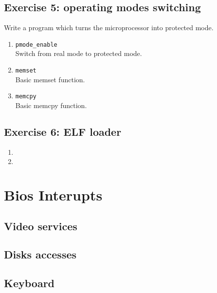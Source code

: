 \subsection*{Exercise 5: operating modes switching}

Write a program which turns the microprocessor into protected mode.

  \begin{enumerate}
  \item {\tt pmode\_enable}\\
  Switch from real mode to protected mode.
  \item {\tt memset}\\
  Basic memset function.
  \item {\tt memcpy}\\
  Basic memcpy function.
  \end{enumerate}

\subsection*{Exercise 6: ELF loader}


  \begin{enumerate}
  \item {\tt }
  \item {\tt }
  \end{enumerate}

\newpage


%
%

\section{Bios Interupts}

\subsection{Video services}





\subsection{Disks accesses}





\subsection{Keyboard}





